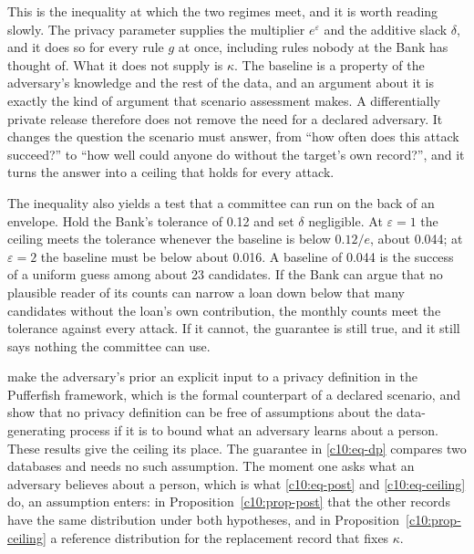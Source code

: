This is the inequality at which the two regimes meet, and it is worth reading
slowly. The privacy parameter supplies the multiplier $e^\varepsilon$ and the
additive slack $\delta$, and it does so for every rule $g$ at once, including
rules nobody at the Bank has thought of. What it does not supply is $\kappa$. The
baseline is a property of the adversary's knowledge and the rest of the data, and
an argument about it is exactly the kind of argument that scenario assessment
makes. A differentially private release therefore does not remove the need for a
declared adversary. It changes the question the scenario must answer, from ``how
often does this attack succeed?'' to ``how well could anyone do without the
target's own record?'', and it turns the answer into a ceiling that holds for
every attack.

The inequality also yields a test that a committee can run on the back of an
envelope. Hold the Bank's tolerance of 0.12 and set $\delta$ negligible. At
$\varepsilon = 1$ the ceiling meets the tolerance whenever the baseline is below
$0.12/e$, about 0.044; at $\varepsilon = 2$ the baseline must be below about
0.016.
A baseline of 0.044 is the success of a uniform guess among about 23 candidates.
If the Bank can argue that no plausible reader of its counts can narrow a loan down
below that many candidates without the loan's own contribution, the monthly
counts meet the tolerance against every attack. If it cannot, the guarantee is
still true, and it still says nothing the committee can use.

\citet{kifer2014} make the adversary's prior an explicit input to a privacy
definition in the Pufferfish framework, which is the formal counterpart of a
declared scenario, and \citet{kifer2011} show that no privacy definition can be
free of assumptions about the data-generating process if it is to bound what an
adversary learns about a person. These results give the ceiling its place. The
guarantee in \eqref{c10:eq-dp} compares two databases and needs no such
assumption. The moment one asks what an adversary believes about a person, which
is what \eqref{c10:eq-post} and \eqref{c10:eq-ceiling} do, an assumption enters:
in Proposition~\ref{c10:prop-post} that the other records have the same
distribution under both hypotheses, and in Proposition~\ref{c10:prop-ceiling} a
reference distribution for the replacement record that fixes $\kappa$.

